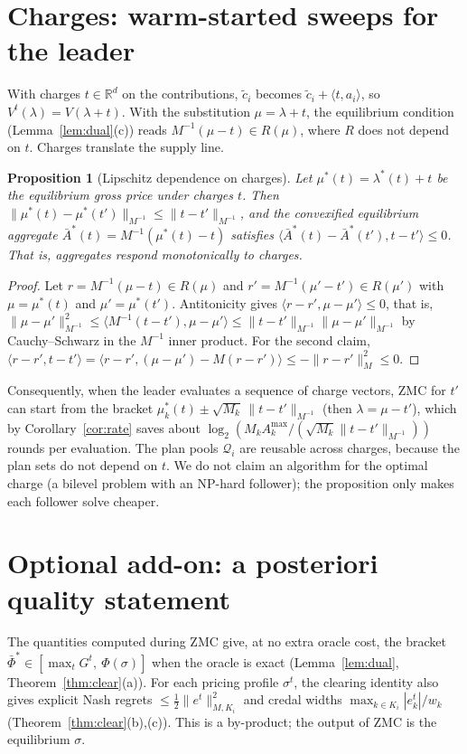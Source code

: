 \documentclass[11pt]{article}
\newtheorem{proposition}[theorem]{Proposition}
\theoremstyle{definition}
\theoremstyle{remark}
\newcommand{\R}{\mathbb{R}}
\newcommand{\ip}[2]{\langle #1,#2\rangle}
\newcommand{\Abar}{\bar A}
\newcommand{\Amax}{A^{\max}}
\begin{document}
\section{Charges: warm-started sweeps for the leader}\label{sec:charges}

With charges $t\in\R^d$ on the contributions, $\tilde c_i$ becomes $\tilde c_i+\ip{t}{a_i}$, so $V^t(\lambda)=V(\lambda+t)$. With the substitution $\mu=\lambda+t$, the equilibrium condition (Lemma~\ref{lem:dual}(c)) reads $M^{-1}(\mu-t)\in R(\mu)$, where $R$ does not depend on $t$. Charges translate the supply line.

\begin{proposition}[Lipschitz dependence on charges]\label{prop:charges}
Let $\mu^*(t)=\lambda^*(t)+t$ be the equilibrium gross price under charges $t$. Then $\|\mu^*(t)-\mu^*(t')\|_{M^{-1}}\le\|t-t'\|_{M^{-1}}$, and the convexified equilibrium aggregate $\Abar^*(t)=M^{-1}(\mu^*(t)-t)$ satisfies $\ip{\Abar^*(t)-\Abar^*(t')}{t-t'}\le0$. That is, aggregates respond monotonically to charges.
\end{proposition}
\begin{proof}
Let $r=M^{-1}(\mu-t)\in R(\mu)$ and $r'=M^{-1}(\mu'-t')\in R(\mu')$ with $\mu=\mu^*(t)$ and $\mu'=\mu^*(t')$. Antitonicity gives $\ip{r-r'}{\mu-\mu'}\le0$, that is, $\|\mu-\mu'\|^2_{M^{-1}}\le\ip{M^{-1}(t-t')}{\mu-\mu'}\le\|t-t'\|_{M^{-1}}\|\mu-\mu'\|_{M^{-1}}$ by Cauchy--Schwarz in the $M^{-1}$ inner product. For the second claim, $\ip{r-r'}{t-t'}=\ip{r-r'}{(\mu-\mu')-M(r-r')}\le-\|r-r'\|^2_M\le0$.
\end{proof}

Consequently, when the leader evaluates a sequence of charge vectors, ZMC for $t'$ can start from the bracket $\mu^*_k(t)\pm\sqrt{M_k}\,\|t-t'\|_{M^{-1}}$ (then $\lambda=\mu-t'$), which by Corollary~\ref{cor:rate} saves about $\log_2(M_k\Amax_k/(\sqrt{M_k}\|t-t'\|_{M^{-1}}))$ rounds per evaluation. The plan pools $\mathcal Q_i$ are reusable across charges, because the plan sets do not depend on $t$. We do not claim an algorithm for the optimal charge (a bilevel problem with an NP-hard follower); the proposition only makes each follower solve cheaper.

\section{Optional add-on: a posteriori quality statement}\label{sec:addon}

The quantities computed during ZMC give, at no extra oracle cost, the bracket $\bar\Phi^*\in[\max_tG^t,\ \Phi(\sigma)]$ when the oracle is exact (Lemma~\ref{lem:dual}, Theorem~\ref{thm:clear}(a)). For each pricing profile $\sigma^t$, the clearing identity also gives explicit Nash regrets $\le\tfrac12\|e^t\|^2_{M,K_i}$ and credal widths $\max_{k\in K_i}|e^t_k|/w_k$ (Theorem~\ref{thm:clear}(b),(c)). This is a by-product; the output of ZMC is the equilibrium $\sigma$.
\end{document}
